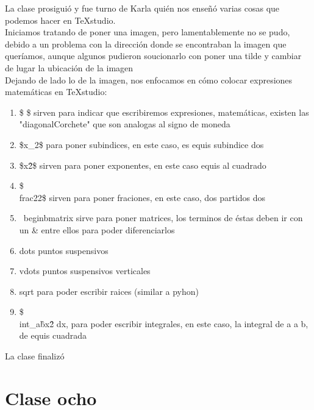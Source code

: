 \documentclass{book}
\begin{document}
La clase prosiguió y fue turno de Karla quién nos enseñó varias cosas que podemos hacer en TeXstudio. \\
Iniciamos tratando de poner una imagen, pero lamentablemente no se pudo, debido a un problema con la dirección donde se encontraban la imagen que queríamos, aunque algunos pudieron soucionarlo con poner una tilde y cambiar de lugar la ubicación de la imagen\\
Dejando de lado lo de la imagen, nos enfocamos en cómo colocar expresiones matemáticas en TeXstudio:
\begin{enumerate}
	\item \$ \$ sirven para indicar que escribiremos expresiones, matemáticas, existen las "diagonalCorchete" que son analogas al signo de moneda
	\item \$x\_{2}\$ para poner subindices, en este caso, es equis subindice dos
	\item \$x\^{2}\$ sirven para poner exponentes, en este caso equis al cuadrado
	\item \$\\frac{2}{2}\$ sirven para poner fraciones, en este caso, dos partidos dos
	\item \ begin{bmatrix} sirve para poner matrices, los terminos de éstas deben ir con un \& entre ellos para poder diferenciarlos
	\item dots puntos suspensivos
	\item vdots puntos suspensivos  verticales
	\item sqrt para poder escribir raices (similar a pyhon)
	\item \$\\int\_{a}\^{b}x\^2 dx, para poder escribir integrales, en este caso, la integral de a a b, de equis cuadrada
	
	
\end{enumerate}
La clase finalizó
\chapter{Clase ocho}
\end{document}
